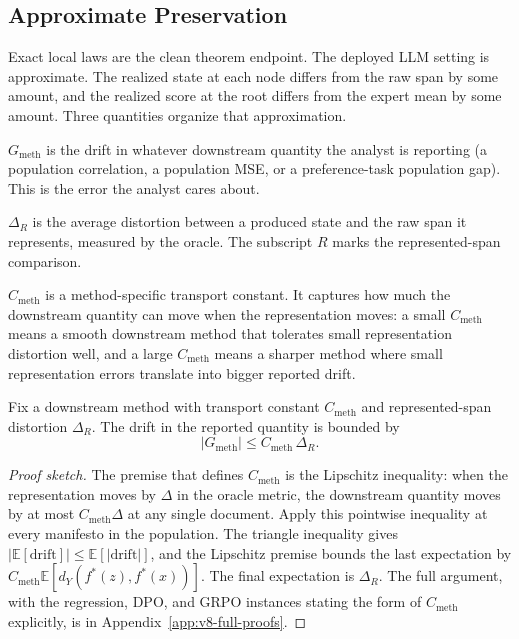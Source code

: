 \subsection{Approximate Preservation}

Exact local laws are the clean theorem endpoint. The deployed LLM
setting is approximate. The realized state at each node differs from
the raw span by some amount, and the realized score at the root
differs from the expert mean by some amount. Three quantities organize
that approximation.

\(G_{\mathrm{meth}}\) is the drift in whatever downstream quantity the
analyst is reporting (a population correlation, a population MSE, or a
preference-task population gap). This is the error the analyst cares
about.

\(\Delta_R\) is the average distortion between a produced state and
the raw span it represents, measured by the oracle. The subscript
\(R\) marks the represented-span comparison.

\(C_{\mathrm{meth}}\) is a method-specific transport constant. It
captures how much the downstream quantity can move when the
representation moves: a small \(C_{\mathrm{meth}}\) means a smooth
downstream method that tolerates small representation distortion well,
and a large \(C_{\mathrm{meth}}\) means a sharper method where small
representation errors translate into bigger reported drift.

\begin{proposition}\label{prop:v10-population-gap}
Fix a downstream method with transport constant \(C_{\mathrm{meth}}\)
and represented-span distortion \(\Delta_R\). The drift in the
reported quantity is bounded by
\begin{equation}
\label{eq:v8-population-gap}
  |G_{\mathrm{meth}}|
  \le
  C_{\mathrm{meth}}\,\Delta_R .
\end{equation}
\end{proposition}

\begin{proof}[Proof sketch]
The premise that defines \(C_{\mathrm{meth}}\) is the Lipschitz
inequality: when the representation moves by \(\Delta\) in the oracle
metric, the downstream quantity moves by at most
\(C_{\mathrm{meth}}\Delta\) at any single document. Apply this
pointwise inequality at every manifesto in the population. The
triangle inequality gives
\(|\mathbb E[\mathrm{drift}]|\le\mathbb E[|\mathrm{drift}|]\), and
the Lipschitz premise bounds the last expectation by
\(C_{\mathrm{meth}}\mathbb E[d_Y(f^\ast(z),f^\ast(x))]\). The final
expectation is \(\Delta_R\).
The full argument, with the regression, DPO, and GRPO instances
stating the form of \(C_{\mathrm{meth}}\) explicitly, is in
Appendix~\ref{app:v8-full-proofs}.
\end{proof}


